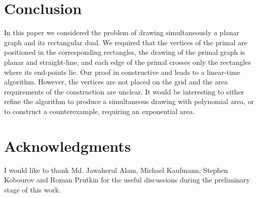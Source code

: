 \documentclass{llncs}
\begin{document}
\section{Conclusion}
In this paper we  considered the problem of drawing simultaneously a planar graph and its rectangular dual. We required that the vertices of the primal are positioned in the corresponding rectangles, the drawing of the primal graph is planar and straight-line, and each edge of the primal crosses only the rectangles where its end-points lie. Our proof in constructive and leads to a linear-time algorithm. However, the vertices  are not placed on the grid and the area requirements of the construction are unclear. It would be interesting to either refine the algorithm to produce a simultaneous drawing with polynomial area, or to construct a counterexample, requiring an exponential area. 

\section*{Acknowledgments} I would like to thank Md. Jawaherul Alam,  Michael Kaufmann, Stephen Kobourov and Roman Prutkin for the useful discussions during the preliminary stage of this work.



\end{document}
